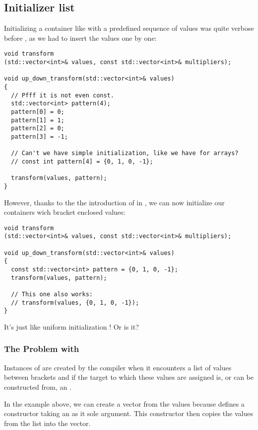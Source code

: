 \subsection{Initializer list}
\label{initializer-list}

Initializing a container like  with a predefined
sequence of values was quite verbose before , as we had to
insert the values one by one:

\begin{lstlisting}
void transform
(std::vector<int>& values, const std::vector<int>& multipliers);

void up_down_transform(std::vector<int>& values)
{
  // Pfff it is not even const.
  std::vector<int> pattern(4);
  pattern[0] = 0;
  pattern[1] = 1;
  pattern[2] = 0;
  pattern[3] = -1;

  // Can't we have simple initialization, like we have for arrays?
  // const int pattern[4] = {0, 1, 0, -1};

  transform(values, pattern);
}
\end{lstlisting}

%
%
However, thanks to the the introduction of
 in , we can now initialize our
containers wich bracket enclosed values:

\begin{lstlisting}
void transform
(std::vector<int>& values, const std::vector<int>& multipliers);

void up_down_transform(std::vector<int>& values)
{
  const std::vector<int> pattern = {0, 1, 0, -1};
  transform(values, pattern);

  // This one also works:
  // transform(values, {0, 1, 0, -1});
}
\end{lstlisting}

It's just like uniform initialization !
Or is it?

\subsubsection{The Problem with }

Instances of  are created by the compiler
when it encounters a list of values between brackets and if the target
to which these values are assigned is, or can be constructed from, an
.

In the example above, we can create a vector from the values because
 defines a constructor taking an
 as it sole argument. This constructor
then copies the values from the list into the vector.

